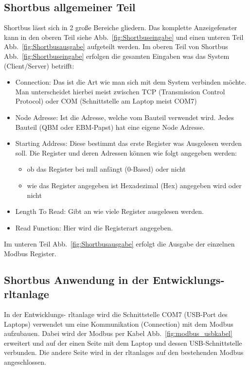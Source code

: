 \subsection{Shortbus allgemeiner Teil}
Shortbus lässt sich in 2 große Bereiche gliedern. Das komplette Anzeigefenster kann in den oberen Teil siehe Abb.~\ref{fig:Shortbuseingabe} und einen unteren Teil Abb.~\ref{fig:Shortbusausgabe} aufgeteilt werden.
Im oberen Teil von Shortbus Abb.~\ref{fig:Shortbuseingabe} erfolgen die gesamten Eingaben was das System (Client/Server) betrifft:
\begin{itemize}
	\item Connection: Das ist die Art wie man sich mit dem System verbinden möchte. Man unterscheidet hierbei meist zwischen TCP (Transmission Control Protocol) oder COM (Schnittstelle am Laptop meist COM7)
	
	\item Node Adresse: Ist die Adresse, welche vom Bauteil verwendet wird. Jedes Bauteil (\zB QBM oder EBM-Papst) hat eine eigene Node Adresse.
	
	\item Starting Address: Diese bestimmt das erste Register was Ausgelesen werden soll. Die Register und deren Adressen können wie folgt angegeben werden:
		\begin{itemize}
			\item ob das Register bei null anfängt (0-Based) oder nicht
			\item wie das Register angegeben ist Hexadezimal (Hex) angegeben wird oder nicht
		\end{itemize}
	\item Length To Read: Gibt an wie viele Register ausgelesen werden. 
	\item Read Function: Hier wird die Registerart angegeben.
\end{itemize}

Im unteren Teil Abb.~\ref{fig:Shortbusausgabe} erfolgt die Ausgabe der einzelnen Modbus Register.  


  

\subsection{Shortbus Anwendung in der Entwicklungs- \ac{rltanlage}}

In der Entwicklungs- \ac{rltanlage} wird die Schnittstelle COM7 (USB-Port des Laptops) verwendet um eine Kommunikation (Connection) mit dem Modbus aufzubauen. Dabei wird der Modbus per Kabel  Abb.~\ref{fig:modbus_usbkabel} erweitert und auf der einen Seite mit dem Laptop und dessen USB-Schnittstelle verbunden. Die andere Seite wird in der \acp{rltanlage} auf den bestehenden Modbus angeschlossen. 

